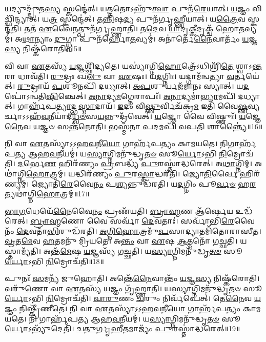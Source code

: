 𑌯𑌦𑍍𑌯𑍁𑌦𑍍𑌦𑍍𑌰𑍁᳴𑌤\-\ul{𑌸𑍍𑌯} 𑌸𑍍𑌕𑌨𑍍𑌦𑍇॑𑌤𑍍।
𑌯𑌤𑍍𑌤𑌤𑍋\-𑌽𑌹𑍁᳴\-\ul{𑌤𑍍𑌵𑌾} 𑌪𑍁𑌨᳴\-\ul{𑌰𑍇}\-𑌯𑌾𑌤𑍍।
\-\ul{𑌯}\-𑌜𑍍𑌞𑌂 𑌵𑌿𑌚𑍍𑌛𑌿᳴𑌨𑍍𑌦𑍍𑌯𑌾𑌤𑍍।
𑌯\-\ul{𑌤𑍍𑌰} 𑌸𑍍𑌕𑌨𑍍𑌦𑍇॑𑌤𑍍।
𑌤\-\ul{𑌨𑍍𑌨𑌿}\-𑌷\-\ul{𑌦𑍍𑌯} 𑌪𑍁𑌨᳴𑌰𑍍𑌗𑍃𑌹𑍍𑌣𑍀𑌯𑌾𑌤𑍍।
𑌯\-\ul{𑌤𑍍𑌰𑍈}\-𑌵 𑌸𑍍𑌕𑌨𑍍𑌦᳴𑌤𑌿।
𑌤𑌤᳴ \ul{𑌏}\-𑌵𑍈\-\ul{𑌨}\-𑌤𑍍𑌪𑍁𑌨᳴𑌰𑍍𑌗𑍃𑌹𑍍𑌣𑌾𑌤𑌿।
𑌤\-\ul{𑌦𑍇}\-𑌵 \ul{𑌯𑌾}\-𑌦𑍃\-\ul{𑌕𑍍𑌕𑍀}\-𑌦𑍃𑌕𑍍𑌚᳴ 𑌹𑍋\-\ul{𑌤}\-𑌵𑍍𑌯𑌮𑍍॑।
𑌅\-\ul{𑌥𑌾}\-𑌨𑍍𑌯𑌾𑌂 \ul{𑌦𑍁}\-𑌗𑍍𑌧𑍍𑌵𑌾 𑌪𑍁𑌨᳴𑌰𑍍\mbox{}𑌹𑍋\-\ul{𑌤}\-𑌵𑍍𑌯𑌮𑍍॑।
𑌅𑌨𑌾॑𑌰𑍍𑌤𑍇\-\ul{𑌨𑍈}\-𑌵𑌾𑌰𑍍𑌤𑌂᳴ \ul{𑌯}\-𑌜𑍍𑌞\-\ul{𑌸𑍍𑌯} 𑌨𑌿𑌷𑍍𑌕᳴𑌰𑍋𑌤𑌿॥15॥

𑌵𑌿 𑌵𑌾 \ul{𑌏}\-𑌤𑌸𑍍𑌯᳴ \ul{𑌯}\-𑌜𑍍𑌞𑌶𑍍𑌛𑌿᳴𑌦𑍍𑌯𑌤𑍇।
𑌯𑌸𑍍𑌯𑌾॑𑌗𑍍𑌨𑌿\-\ul{𑌹𑍋}\-𑌤𑍍𑌰𑍇᳴\-𑌽𑌧𑌿𑌶𑍍𑌰𑌿᳴\-\ul{𑌤𑍇} 𑌶𑍍𑌵𑌾\-𑌽\-\ul{𑌨𑍍𑌤}\-𑌰𑌾 𑌧𑌾𑌵᳴𑌤𑌿।
\-\ul{𑌰𑍁}\-𑌦𑍍𑌰𑌃 𑌖\-\ul{𑌲𑍁} 𑌵𑌾 \ul{𑌏}\-𑌷𑌃।
𑌯\-\ul{𑌦}\-𑌗𑍍𑌨𑌿𑌃।
𑌯𑌦𑍍𑌗𑌾𑌮᳴𑌨𑍍𑌵𑌤𑍍𑌯𑌾 \ul{𑌵}\-𑌰𑍍𑌤𑌯𑍇॑𑌤𑍍।
\-\ul{𑌰𑍁}\-𑌦𑍍𑌰𑌾𑌯᳴ \ul{𑌪}\-𑌶𑍂𑌨𑌪𑌿᳴ 𑌦𑌧𑍍𑌯𑌾𑌤𑍍।
\-\ul{𑌅}\-\-\ul{𑌪}\-𑌶𑍁𑌰𑍍𑌯𑌜᳴𑌮𑌾𑌨𑌃 𑌸𑍍𑌯𑌾𑌤𑍍।
𑌯\-\ul{𑌦}\-𑌪𑍋॑\-𑌽𑌨𑍍𑌵𑌤𑌿\-\ul{𑌷𑌿}\-𑌞𑍍𑌚𑍇𑌤𑍍।
\-\ul{𑌅}\-\-\ul{𑌨𑌾}\-𑌦𑍍𑌯\-\ul{𑌮}\-𑌗𑍍𑌨𑍇𑌰𑌾𑌪𑌃᳴।
\-\ul{𑌅}\-\-\ul{𑌨𑌾}\-𑌦𑍍𑌯𑌮𑌾॑\-\ul{𑌭𑍍𑌯𑌾}\-𑌮𑌪𑌿᳴ 𑌦𑌧𑍍𑌯𑌾𑌤𑍍।
𑌗𑌾𑌰𑍍\mbox{}𑌹᳴𑌪\-\ul{𑌤𑍍𑌯𑌾}\-𑌦𑍍𑌭\-\ul{𑌸𑍍𑌮𑌾}\-𑌦𑌾𑌯᳴।
\-\ul{𑌇}\-𑌦𑌂 𑌵𑌿\-\ul{𑌷𑍍𑌣𑍁}\-𑌰𑍍𑌵𑌿𑌚᳴𑌕𑍍𑌰\-\ul{𑌮} 𑌇𑌤𑌿᳴ 𑌵𑍈\-\ul{𑌷𑍍𑌣}\-𑌵𑍍𑌯𑌰𑍍𑌚𑌾\-𑌽𑌽𑌹᳴\-\ul{𑌵}\-𑌨𑍀𑌯𑌾॑𑌦𑍍‌\-\ul{𑌧𑍍𑌵}\-\-\ul{𑍞}\-𑌸\-\ul{𑌯}\-𑌨𑍍𑌨𑍁𑌦𑍍𑌰᳴𑌵𑍇𑌤𑍍।
\-\ul{𑌯}\-𑌜𑍍𑌞𑍋 𑌵𑍈 𑌵𑌿𑌷𑍍𑌣𑍁𑌃᳴।
\-\ul{𑌯}\-𑌜𑍍𑌞𑍇\-\ul{𑌨𑍈}\-𑌵 \ul{𑌯}\-𑌜𑍍𑌞𑍞 𑌸𑌨𑍍𑌤᳴𑌨𑍋𑌤𑌿।
𑌭𑌸𑍍𑌮᳴𑌨𑌾 \ul{𑌪}\-𑌦𑌮𑌪𑌿᳴ 𑌵𑌪\-\ul{𑌤𑌿} 𑌶𑌾𑌨𑍍𑌤𑍍𑌯𑍈॑॥16॥\anuvakamend[𑌵𑍈 \ul{𑌦𑍇}\-𑌵𑍍𑌯𑌦𑌿᳴𑌤𑌿𑌰𑍍𑌮𑍁𑌞𑍍𑌚𑌤𑌿 𑌸𑍃𑌜𑌤𑌿 𑌕𑌰𑍋𑌤𑌿 𑌕𑌰𑍋𑌤𑍍𑌯𑌾\-\ul{𑌭𑍍𑌯𑌾}\-𑌮𑌪𑌿᳴ 𑌦\-\ul{𑌧𑍍𑌯𑌾}\-𑌤𑍍 𑌪𑌞𑍍𑌚᳴ 𑌚]

𑌨𑌿 𑌵𑌾 \ul{𑌏}\-𑌤𑌸𑍍𑌯𑌾᳴\-𑌽𑌽𑌹\-\ul{𑌵}\-𑌨𑍀\-\ul{𑌯𑍋} 𑌗𑌾𑌰𑍍\mbox{}𑌹᳴𑌪𑌤𑍍𑌯𑌂 𑌕𑌾𑌮𑌯𑌤𑍇।
𑌨𑌿𑌗𑌾𑌰𑍍\mbox{}𑌹᳴𑌪𑌤𑍍𑌯 𑌆𑌹\-\ul{𑌵}\-𑌨𑍀𑌯𑌮𑍍॑।
𑌯\-\ul{𑌸𑍍𑌯𑌾}\-𑌗𑍍𑌨𑌿𑌮𑌨𑍁᳴𑌦𑍍𑌧𑍃\-\ul{𑌤}\-\-\ul{𑍞} 𑌸𑍂\-\ul{𑌰𑍍𑌯𑍋}\-𑌽𑌭𑌿 \ul{𑌨𑌿}\-𑌮𑍍𑌰𑍋𑌚᳴𑌤𑌿।
\-\ul{𑌦}\-𑌰𑍍𑌭𑍇\-\ul{𑌣} 𑌹𑌿𑌰᳴𑌣𑍍𑌯𑌂 \ul{𑌪𑍍𑌰}\-𑌬𑌦𑍍𑌧𑍍𑌯᳴ \ul{𑌪𑍁}\-𑌰𑌸𑍍𑌤𑌾॑𑌦𑍍𑌧𑌰𑍇𑌤𑍍।
𑌅\-\ul{𑌥𑌾}\-𑌗𑍍𑌨𑌿𑌮𑍍।
𑌅𑌥𑌾॑𑌗𑍍𑌨𑌿\-\ul{𑌹𑍋}\-𑌤𑍍𑌰𑌮𑍍।
𑌯𑌦𑍍𑌧𑌿𑌰᳴𑌣𑍍𑌯𑌂 \ul{𑌪𑍁}\-𑌰\-\ul{𑌸𑍍𑌤𑌾}\-𑌦𑍍𑌧𑌰᳴𑌤𑌿।
𑌜𑍍𑌯𑍋\-\ul{𑌤𑌿}\-𑌰𑍍𑌵𑍈 𑌹𑌿𑌰᳴𑌣𑍍𑌯𑌮𑍍।
𑌜𑍍𑌯𑍋𑌤𑌿᳴\-\ul{𑌰𑍇}\-𑌵𑍈\-\ul{𑌨𑌂} 𑌪\-\ul{𑌶𑍍𑌯}\-𑌨𑍍𑌨𑍁𑌦𑍍𑌧᳴𑌰𑌤𑌿।
𑌯\-\ul{𑌦}\-𑌗𑍍𑌨𑌿𑌂 𑌪𑍂\-\ul{𑌰𑍍𑌵}\-\-\ul{𑍞} 𑌹\-\ul{𑌰}\-𑌤𑍍𑌯𑌥𑌾॑𑌗𑍍𑌨𑌿\-\ul{𑌹𑍋}\-𑌤𑍍𑌰𑌮𑍍॥17॥

\-\ul{𑌭𑌾}\-\-\ul{𑌗}\-𑌧𑍇𑌯𑍇᳴\-\ul{𑌨𑍈}\-𑌵𑍈\-\ul{𑌨𑌂} 𑌪𑍍𑌰𑌣᳴𑌯𑌤𑌿।
\-\ul{𑌬𑍍𑌰𑌾}\-\-\ul{𑌹𑍍𑌮}\-𑌣 𑌆᳴𑌰𑍍\mbox{}\-\ul{𑌷𑍇}\-𑌯 𑌉𑌦𑍍𑌧᳴𑌰𑍇𑌤𑍍।
\-\ul{𑌬𑍍𑌰𑌾}\-\-\ul{𑌹𑍍𑌮}\-𑌣𑍋 𑌵𑍈 𑌸𑌰𑍍𑌵𑌾᳴ \ul{𑌦𑍇}\-𑌵𑌤𑌾𑌃॑।
𑌸𑌰𑍍𑌵𑌾᳴𑌭𑌿\-\ul{𑌰𑍇}\-𑌵𑍈𑌨𑌂᳴ \ul{𑌦𑍇}\-𑌵𑌤𑌾᳴\-\ul{𑌭𑌿}\-𑌰𑍁𑌦𑍍𑌧᳴𑌰𑌤𑌿।
\-\ul{𑌅}\-\-\ul{𑌗𑍍𑌨𑌿}\-\-\ul{𑌹𑍋}\-𑌤𑍍𑌰𑌮𑍁᳴\-\ul{𑌪}\-𑌸𑌾𑌦𑍍𑌯𑌾𑌤𑌮𑌿᳴𑌤𑍋𑌰𑌾𑌸𑍀𑌤।
\-\ul{𑌵𑍍𑌰}\-𑌤\-\ul{𑌮𑍇}\-𑌵 \ul{𑌹}\-𑌤𑌮𑌨𑍁᳴ 𑌮𑍍𑌰𑌿𑌯𑌤𑍇।
𑌅\-\ul{𑌨𑍍𑌤𑌂} 𑌵𑌾 \ul{𑌏}\-𑌷 \ul{𑌆}\-𑌤𑍍𑌮𑌨𑍋᳴ 𑌗𑌚𑍍𑌛𑌤𑌿।
𑌯𑌸𑍍𑌤𑌾𑌮𑍍𑌯᳴𑌤𑌿।
𑌅𑌨𑍍𑌤᳴\-\ul{𑌮𑍇}\-𑌷 \ul{𑌯}\-𑌜𑍍𑌞𑌸𑍍𑌯᳴ 𑌗𑌚𑍍𑌛𑌤𑌿।
𑌯\-\ul{𑌸𑍍𑌯𑌾}\-𑌗𑍍𑌨𑌿𑌮𑌨𑍁᳴𑌦𑍍𑌧𑍃\-\ul{𑌤}\-\-\ul{𑍞} 𑌸𑍂\-\ul{𑌰𑍍𑌯𑍋}\-𑌽𑌭𑌿 \ul{𑌨𑌿}\-𑌮𑍍𑌰𑍋𑌚᳴𑌤𑌿॥18॥

𑌪𑍁𑌨𑌃᳴ \ul{𑌸}\-𑌮𑌨𑍍𑌯᳴ 𑌜𑍁𑌹𑍋𑌤𑌿।
𑌅𑌨𑍍𑌤𑍇᳴\-\ul{𑌨𑍈}\-𑌵𑌾𑌨𑍍𑌤𑌂᳴ \ul{𑌯}\-𑌜𑍍𑌞\-\ul{𑌸𑍍𑌯} 𑌨𑌿𑌷𑍍𑌕᳴𑌰𑍋𑌤𑌿।
𑌵𑌰𑍁᳴\-\ul{𑌣𑍋} 𑌵𑌾 \ul{𑌏}\-𑌤𑌸𑍍𑌯᳴ \ul{𑌯}\-𑌜𑍍𑌞𑌂 𑌗𑍃᳴𑌹𑍍𑌣𑌾𑌤𑌿।
𑌯\-\ul{𑌸𑍍𑌯𑌾}\-𑌗𑍍𑌨𑌿𑌮𑌨𑍁᳴𑌦𑍍𑌧𑍃\-\ul{𑌤}\-\-\ul{𑍞} 𑌸𑍂\-\ul{𑌰𑍍𑌯𑍋}\-𑌽𑌭𑌿 \ul{𑌨𑌿}\-𑌮𑍍𑌰𑍋𑌚᳴𑌤𑌿।
\-\ul{𑌵𑌾}\-\-\ul{𑌰𑍁}\-𑌣𑌂 \ul{𑌚}\-𑌰𑍁𑌂 𑌨𑌿𑌰𑍍𑌵᳴𑌪𑍇𑌤𑍍।
𑌤𑍇\-\ul{𑌨𑍈}\-𑌵 \ul{𑌯}\-𑌜𑍍𑌞𑌂 𑌨𑌿𑌷𑍍𑌕𑍍𑌰𑍀᳴𑌣𑍀𑌤𑍇।
𑌨𑌿 𑌵𑌾 \ul{𑌏}\-𑌤𑌸𑍍𑌯𑌾᳴\-𑌽𑌽𑌹\-\ul{𑌵}\-𑌨𑍀\-\ul{𑌯𑍋} 𑌗𑌾𑌰𑍍\mbox{}𑌹᳴𑌪𑌤𑍍𑌯𑌂 𑌕𑌾𑌮𑌯𑌤𑍇।
𑌨𑌿 𑌗𑌾𑌰𑍍\mbox{}𑌹᳴𑌪𑌤𑍍𑌯 𑌆𑌹\-\ul{𑌵}\-𑌨𑍀𑌯𑌮𑍍॑।
𑌯\-\ul{𑌸𑍍𑌯𑌾}\-𑌗𑍍𑌨𑌿𑌮𑌨𑍁᳴𑌦𑍍𑌧𑍃\-\ul{𑌤}\-\-\ul{𑍞} 𑌸𑍂\-\ul{𑌰𑍍𑌯𑍋}\-\-𑌽𑌭𑍍𑌯𑍁᳴𑌦𑍇𑌤𑌿᳴।
\-\ul{𑌚}\-\-\ul{𑌤𑍁}\-\-\ul{𑌰𑍍𑌗𑍃}\-\-\ul{𑌹𑍀}\-𑌤𑌮𑌾𑌜𑍍𑌯𑌂᳴ \ul{𑌪𑍁}\-𑌰𑌸𑍍𑌤𑌾॑𑌦𑍍𑌧𑌰𑍇𑌤𑍍॥19॥

